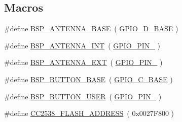 \subsection*{Macros}
\begin{DoxyCompactItemize}
\item 
\#define \hyperlink{_open_mote-_c_c2538_2board_8c_a54e79aca09ca603b2bd7dde3ba7dfdfe}{B\+S\+P\+\_\+\+A\+N\+T\+E\+N\+N\+A\+\_\+\+B\+A\+SE}~( \hyperlink{hw__memmap_8h_a1eb15743fd9e3c8f13e6c72e6e3d9a8e}{G\+P\+I\+O\+\_\+\+D\+\_\+\+B\+A\+SE} )
\item 
\#define \hyperlink{_open_mote-_c_c2538_2board_8c_a9c2bcacb625334d0a7282da5a34245fa}{B\+S\+P\+\_\+\+A\+N\+T\+E\+N\+N\+A\+\_\+\+I\+NT}~( \hyperlink{_open_mote-_c_c2538_2source_2gpio_8h_a01cc9ed93f6fd12fd3403362779aaa18}{G\+P\+I\+O\+\_\+\+P\+I\+N\+\_} )
\item 
\#define \hyperlink{_open_mote-_c_c2538_2board_8c_a728eeba6fdbe78edaa67c6c433073d33}{B\+S\+P\+\_\+\+A\+N\+T\+E\+N\+N\+A\+\_\+\+E\+XT}~( \hyperlink{_open_mote-_c_c2538_2source_2gpio_8h_ab3871e35868deecd260e586ad70d4b83}{G\+P\+I\+O\+\_\+\+P\+I\+N\+\_} )
\item 
\#define \hyperlink{_open_mote-_c_c2538_2board_8c_a876f677fffd3533f28860ab84a553928}{B\+S\+P\+\_\+\+B\+U\+T\+T\+O\+N\+\_\+\+B\+A\+SE}~( \hyperlink{hw__memmap_8h_a35eb93c001f3b576606bb177393085ea}{G\+P\+I\+O\+\_\+\+C\+\_\+\+B\+A\+SE} )
\item 
\#define \hyperlink{_open_mote-_c_c2538_2board_8c_af2595f0cc04689506e596f7d8898b664}{B\+S\+P\+\_\+\+B\+U\+T\+T\+O\+N\+\_\+\+U\+S\+ER}~( \hyperlink{_open_mote-_c_c2538_2source_2gpio_8h_adcaf899c018a0dde572b5af783565c62}{G\+P\+I\+O\+\_\+\+P\+I\+N\+\_} )
\item 
\#define \hyperlink{_open_mote-_c_c2538_2board_8c_a4aff7defd67d17a3dc718c3961fbc684}{C\+C2538\+\_\+\+F\+L\+A\+S\+H\+\_\+\+A\+D\+D\+R\+E\+SS}~( 0x0027\+F800 )
\end{DoxyCompactItemize}
